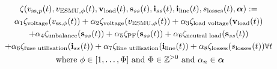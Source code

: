 \begin{multline}
	\zeta(v_{\text{ss},p}(t), v_{\text{ESMU},\phi}(t), \textbf{v}_{\text{load}}(t), \textbf{s}_{ss}(t), \textbf{i}_{ss}(t), \textbf{i}_{\text{line}}(t), s_\text{losses}(t), \boldsymbol{\alpha}) :=\\
	\alpha_1 \zeta_\text{voltage}(v_{\text{ss},\phi}(t))%
	+ \alpha_2 \zeta_\text{voltage}(v_{\text{ESMU},\phi}(t))%
	+ \alpha_3 \zeta_\text{\text{load} voltage}(\textbf{v}_{\text{load}}(t))\\
	+ \alpha_4 \zeta_\text{unbalance}(\textbf{s}_{ss}(t))%
	+ \alpha_5 \zeta_\text{PF}(\textbf{s}_{ss}(t))%
	+ \alpha_6 \zeta_{\text{neutral load}}(\textbf{s}_{ss}(t))\\
	+ \alpha_6 \zeta_\text{fuse utilisation}(\textbf{i}_{ss}(t))%
	+ \alpha_7 \zeta_\text{\text{line} utilisation}(\textbf{i}_{\text{line}}(t))%
	+ \alpha_8 \zeta_\text{losses}(s_\text{losses}(t))%
	 \forall t \\
	 \text{ where } \phi \in [1, \dots, \Phi] \text{ and } \Phi \in \mathbb{Z}^{>0} \text{ and } \alpha_n \in \boldsymbol{\alpha}
\label{ch1:equ:weighted-sum-cost-function}
\end{multline}